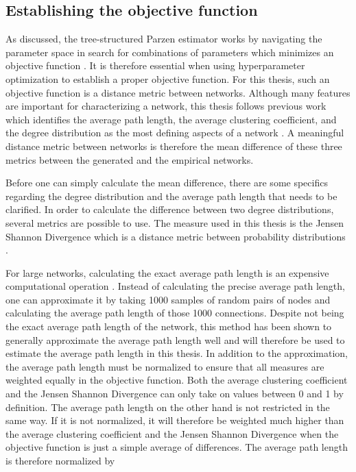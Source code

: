 \documentclass[11pt]{article}
\begin{document}
\subsection{Establishing the objective function}
As discussed, the tree-structured Parzen estimator works by navigating the parameter space in search for combinations of parameters which minimizes an objective function \cite{akiba_optuna_2019}. It is therefore essential when using hyperparameter optimization to establish a proper objective function. For this thesis, such an objective function is a distance metric between networks. Although many features are important for characterizing a network, this thesis follows previous work which identifies the average path length, the average clustering coefficient, and the degree distribution as the most defining aspects of a network \cite{jacksonsearch2004, jacksonmeeting2007}. A meaningful distance metric between networks is therefore the mean difference of these three metrics between the generated and the empirical networks.

\noindent Before one can simply calculate the mean difference, there are some specifics regarding the degree distribution and the average path length that needs to be clarified.
In order to calculate the difference between two degree distributions, several metrics are possible to use. The measure used in this thesis is the Jensen Shannon Divergence which is a distance metric between probability distributions \cite{fuglede_jensen-shannon_2004}. 

For large networks, calculating the exact average path length is an expensive computational operation  \cite{matsumura_average_2018}. Instead of calculating the precise average path length, one can approximate it by taking 1000 samples of random pairs of nodes and calculating the average path length of those 1000 connections. Despite not being the exact average path length of the network, this method has been shown to generally approximate the average path length well \cite{matsumura_average_2018} and will therefore be used to estimate the average path length in this thesis. 
In addition to the approximation, the average path length must be normalized to ensure that all measures are weighted equally in the objective function. Both the average clustering coefficient and the Jensen Shannon Divergence can only take on values between 0 and 1 by definition. The average path length on the other hand is not restricted in the same way. If it is not normalized, it will therefore be weighted much higher than the average clustering coefficient and the Jensen Shannon Divergence when the objective function is just a simple average of differences. The average path length is therefore normalized by 
\end{document}
